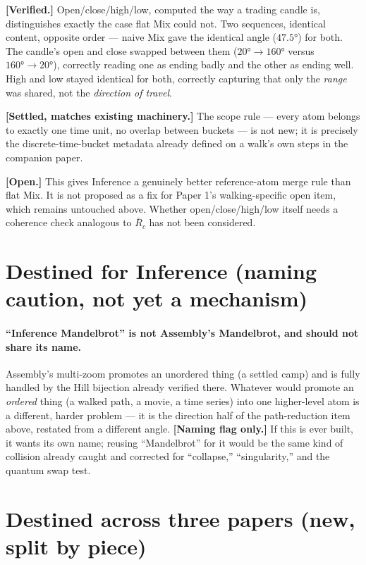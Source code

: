 \documentclass[11pt]{article}
\begin{document}
\textbf{[Verified.]} Open/close/high/low, computed the way a trading
candle is, distinguishes exactly the case flat Mix could not. Two
sequences, identical content, opposite order --- naive Mix gave the
identical angle ($47.5°$) for both. The candle's open and close swapped
between them ($20°\!\to\!160°$ versus $160°\!\to\!20°$), correctly
reading one as ending badly and the other as ending well. High and low
stayed identical for both, correctly capturing that only the
\emph{range} was shared, not the \emph{direction of travel}.

\textbf{[Settled, matches existing machinery.]} The scope rule ---
every atom belongs to exactly one time unit, no overlap between
buckets --- is not new; it is precisely the discrete-time-bucket
metadata already defined on a walk's own steps in the companion paper.

\textbf{[Open.]} This gives Inference a genuinely better reference-atom
merge rule than flat Mix. It is not proposed as a fix for Paper 1's
walking-specific open item, which remains untouched above. Whether
open/close/high/low itself needs a coherence check analogous to
$\bar R_c$ has not been considered.

\section{Destined for Inference (naming caution, not yet a mechanism)}

\paragraph{``Inference Mandelbrot'' is not Assembly's Mandelbrot, and
should not share its name.} Assembly's multi-zoom promotes an
unordered thing (a settled camp) and is fully handled by the Hill
bijection already verified there. Whatever would promote an
\emph{ordered} thing (a walked path, a movie, a time series) into one
higher-level atom is a different, harder problem --- it is the
direction half of the path-reduction item above, restated from a
different angle. \textbf{[Naming flag only.]} If this is ever built,
it wants its own name; reusing ``Mandelbrot'' for it would be the same
kind of collision already caught and corrected for ``collapse,''
``singularity,'' and the quantum swap test.

\section{Destined across three papers (new, split by piece)}
\end{document}
